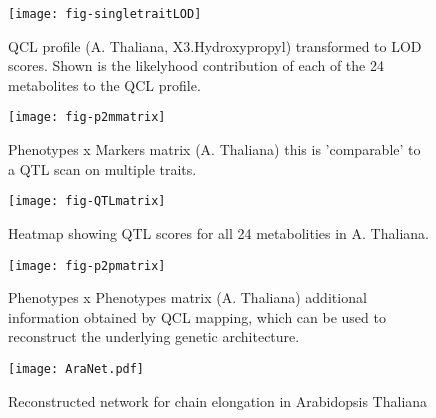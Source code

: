 \documentclass[12pt]{article}
\begin{document}
\begin{figure}
  \centering
\texttt{[image: fig-singletraitLOD]}
  \caption{QCL profile (A. Thaliana, X3.Hydroxypropyl) transformed to LOD scores. Shown is the likelyhood contribution of each of 
  the 24 metabolites to the QCL profile. \label{fig:singletraitLOD}}
\end{figure}

\begin{figure}[ht]
  \centering
\texttt{[image: fig-p2mmatrix]}
  \caption{Phenotypes x Markers matrix (A. Thaliana) this is 'comparable' to a QTL scan on multiple traits.\label{fig:p2mmatrix}}
\end{figure}

\begin{figure}[ht]
  \centering
\texttt{[image: fig-QTLmatrix]}
  \caption{Heatmap showing QTL scores for all 24 metabolities in A. Thaliana.\label{fig:QTLmatrix}}
\end{figure}

\begin{figure}[ht]
  \centering
\texttt{[image: fig-p2pmatrix]}
  \caption{Phenotypes x Phenotypes matrix (A. Thaliana) additional information obtained by QCL mapping, 
  which can be used to reconstruct the underlying genetic architecture.\label{fig:p2pmatrix}}
\end{figure}

\begin{figure}[ht]
  \centerline{\texttt{[image: AraNet.pdf]}}
  \caption{Reconstructed network for chain elongation in Arabidopsis Thaliana}
  \label{AraNet}
\end{figure}
\end{document}
